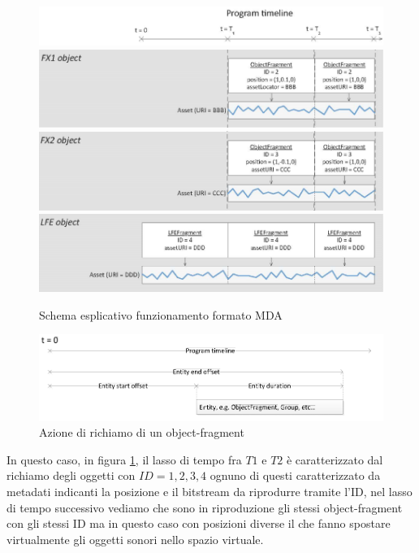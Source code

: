 \documentclass[12pt,a4paper]{report}
\begin{document}
\begin{figure}[htbp]
	\centering
	\includegraphics[scale=0.50]{figures/timeline.png}\\
	\includegraphics[scale=0.50]{figures/object1.png}\\
	\includegraphics[scale=0.50]{figures/object2.png}\\
	\includegraphics[scale=0.50]{figures/object3.png}
	\caption {Schema esplicativo funzionamento formato MDA}
	\label{fig:object}
	\end{figure}

\begin{figure}[htbp]
	\centering
	\includegraphics[scale=0.50]{figures/timeline2.png}
	\caption {Azione di richiamo di un object-fragment}
	\label{fig:time}
	\end{figure}

In questo caso, in figura \ref{fig:object}, il lasso di tempo fra $T1$ e $T2$ è caratterizzato dal richiamo degli oggetti con $ID=1,2,3,4$ ognuno di questi caratterizzato da metadati indicanti la posizione e il bitstream da riprodurre tramite l'ID, nel lasso di tempo successivo vediamo che sono in riproduzione gli stessi object-fragment con gli stessi ID ma in questo caso con posizioni diverse il che fanno spostare virtualmente gli oggetti sonori nello spazio virtuale.
\end{document}
